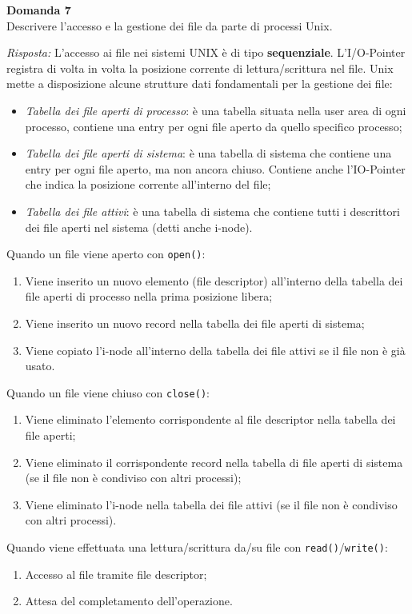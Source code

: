 \documentclass{article}
\newenvironment{problem}[2][Domanda]
    { \begin{mdframed}[backgroundcolor=gray!20] \textbf{#1 #2} \\}
    {  \end{mdframed}}
\newenvironment{solution}
    {\textit{Risposta:}}
    {}
\begin{document}
\begin{problem}{7}
Descrivere l'accesso e la gestione dei file da parte di processi Unix.
\end{problem}
\begin{solution}
L’accesso ai file nei sistemi UNIX è di tipo \textbf{sequenziale}.
L'I/O-Pointer registra di volta in volta la posizione corrente di lettura/scrittura nel file.
\newline
\newline
Unix mette a disposizione alcune strutture dati fondamentali per la gestione dei file:
\begin{itemize}
    \item \emph{Tabella dei file aperti di processo}: è una tabella situata nella user area di ogni processo, contiene una entry per ogni file aperto da quello specifico processo;
    \item \emph{Tabella dei file aperti di sistema}: è una tabella di sistema che contiene una entry per ogni file aperto, ma non ancora chiuso. Contiene anche l’IO-Pointer che indica la posizione corrente all’interno del file;
    \item \emph{Tabella dei file attivi}: è una tabella di sistema che contiene tutti i descrittori dei file aperti nel sistema (detti anche i-node).
\end{itemize}
Quando un file viene aperto con \texttt{open()}:
\begin{enumerate}
    \item Viene inserito un nuovo elemento (file descriptor) all’interno della tabella dei file aperti di  processo nella prima posizione libera;
    \item Viene inserito un nuovo record nella tabella dei file aperti di sistema;
    \item Viene copiato l’i-node all’interno della tabella dei file attivi se il file non è già usato.
\end{enumerate}
Quando un file viene chiuso con \texttt{close()}:
\begin{enumerate}
    \item Viene eliminato l’elemento corrispondente al file descriptor nella tabella dei file aperti;
    \item Viene eliminato il corrispondente record nella tabella di file aperti di sistema (se il file non è condiviso con altri processi);
    \item Viene eliminato l’i-node nella tabella dei file attivi (se il file non è condiviso con altri processi).
\end{enumerate}
Quando viene effettuata una lettura/scrittura da/su file con \texttt{read()}/\texttt{write()}:
\begin{enumerate}
    \item Accesso al file tramite file descriptor;
    \item Attesa del completamento dell’operazione.
\end{enumerate}
\end{solution}
\end{document}
